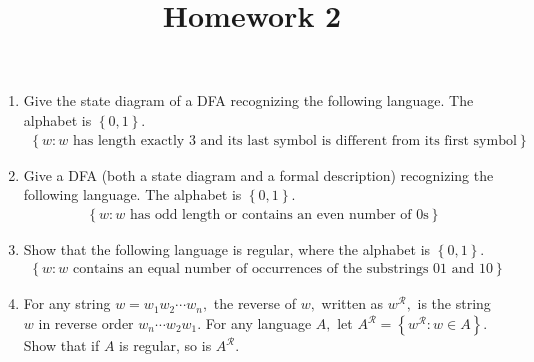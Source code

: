 \documentclass{article}
\begin{document}
\title{Homework 2}
\maketitle
\thispagestyle{fancy}

\begin{enumerate}
	\item Give the state diagram of a DFA recognizing the following language. The alphabet is $\left\{ 0, 1 \right\}.$
		\begin{align*}
			\left\{ w:w\text{ has length exactly 3 and its last symbol is different from its first symbol} \right\}
		\end{align*}

	\item Give a DFA (both a state diagram and a formal description) recognizing the following language. The alphabet is $\left\{ 0, 1 \right\}.$
		\begin{align*}
			\left\{ w:w\text{ has odd length or contains an even number of 0s} \right\}
		\end{align*}

	\item Show that the following language is regular, where the alphabet is $\left\{ 0, 1 \right\}.$
		\begin{align*}
			\left\{ w:w\text{ contains an equal number of occurrences of the substrings 01 and 10} \right\}
		\end{align*}

	\item For any string $w=w_1w_2\cdots w_n,$ the reverse of $w,$ written as $w^{\mathcal R},$ is the string $w$ in reverse order $w_n\cdots w_2 w_1.$ For any language $A,$ let $A^{\mathcal R}=\left\{ w^{\mathcal R}:w\in A \right\}.$ Show that if $A$ is regular, so is $A^{\mathcal R}.$
		
\end{enumerate}
\end{document}
